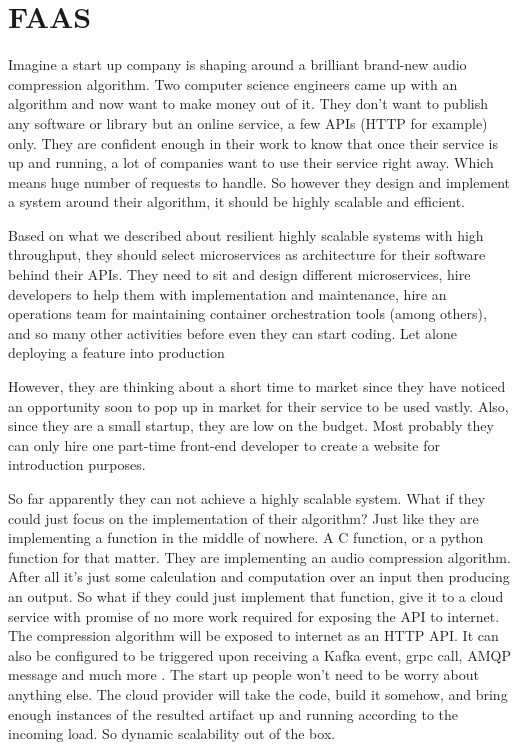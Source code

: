 \documentclass[a4]{report}
\begin{document}
    \section{FAAS}
    Imagine a start up company is shaping around a brilliant brand-new audio compression algorithm.
    Two computer science engineers came up with an algorithm and now want to make money out of it.
    They don't want to publish any software or library but an online service, a few APIs (HTTP for example) only.
    They are confident enough in their work to know that once their service is up and running, a lot of companies
    want to use their service right away.
    Which means huge number of requests to handle.
    So however they design and implement a system around their algorithm, it should be highly scalable and efficient.

    Based on what we described about resilient highly scalable systems with high throughput, they should select
    microservices as architecture for their software behind their APIs.
    They need to sit and design different microservices, hire developers to help them with implementation and
    maintenance, hire an operations team for maintaining container orchestration tools (among others), and so many
    other activities before even they can start coding.
    Let alone deploying a feature into production

    However, they are thinking about a short time to market since they have noticed an opportunity soon to pop up in
    market for their service to be used vastly.
    Also, since they are a small startup, they are low on the budget.
    Most probably they can only hire one part-time front-end developer to create a website for introduction
    purposes.

    So far apparently they can not achieve a highly scalable system.
    What if they could just focus on the implementation of their algorithm?
    Just like they are implementing a function in the middle of nowhere.
    A C function, or a python function for that matter.
    They are implementing an audio compression algorithm.
    After all it's just some calculation and computation over an input then producing an output.
    So what if they could just implement that function, give it to a cloud service with promise of no more work
    required for exposing the API to internet.
    The compression algorithm will be exposed to internet as an HTTP API.
    It can also be configured to be triggered upon receiving a Kafka event, grpc call, AMQP message and much more .
    The start up people won't need to be worry about anything else.
    The cloud provider will take the code, build it somehow, and bring enough instances of the resulted artifact up and
    running according to the incoming load.
    So dynamic scalability out of the box.
\end{document}
